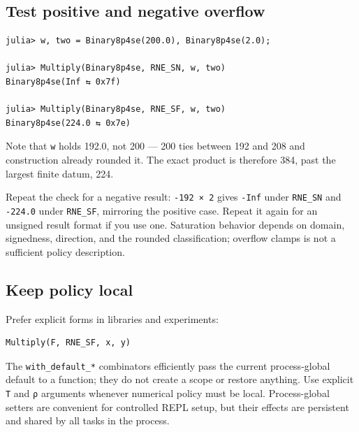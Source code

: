 \subsection{Test positive and negative overflow}



\label{14012995685908840284}{}



\begin{verbatim}
julia> w, two = Binary8p4se(200.0), Binary8p4se(2.0);

julia> Multiply(Binary8p4se, RNE_SN, w, two)
Binary8p4se(Inf ⇆ 0x7f)

julia> Multiply(Binary8p4se, RNE_SF, w, two)
Binary8p4se(224.0 ⇆ 0x7e)
\end{verbatim}



Note that \texttt{w} holds 192.0, not 200 — 200 ties between 192 and 208 and construction already rounded it. The exact product is therefore 384, past the largest finite datum, 224.



Repeat the check for a negative result: \texttt{-192 × 2} gives \texttt{-Inf} under \texttt{RNE\_\allowbreak{}SN} and \texttt{-224.0} under \texttt{RNE\_\allowbreak{}SF}, mirroring the positive case. Repeat it again for an unsigned result format if you use one. Saturation behavior depends on domain, signedness, direction, and the rounded classification; {\textquotedbl}overflow clamps{\textquotedbl} is not a sufficient policy description.



\subsection{Keep policy local}



\label{14403233641742004824}{}


Prefer explicit forms in libraries and experiments:




\nopagebreak[4]
\begin{verbatim}
Multiply(F, RNE_SF, x, y)
\end{verbatim}



The \texttt{with\_\allowbreak{}default\_\allowbreak{}*} combinators efficiently pass the current process-global default to a function; they do not create a scope or restore anything. Use explicit \texttt{T} and \texttt{ρ} arguments whenever numerical policy must be local. Process-global setters are convenient for controlled REPL setup, but their effects are persistent and shared by all tasks in the process.



